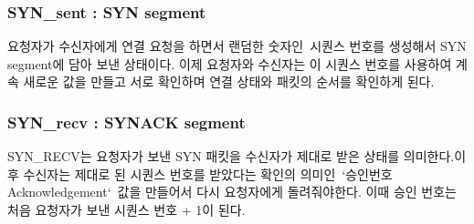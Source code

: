     \subsubsection*{SYN\_sent : SYN segment}
    요청자가 수신자에게 연결 요청을 하면서 랜덤한 숫자인 시퀀스 번호를 생성해서 SYN segment에 담아 보낸 상태이다. 이제 요청자와 수신자는 이 시퀀스 번호를 사용하여 계속 새로운 값을 만들고 서로 확인하며 연결 상태와 패킷의 순서를 확인하게 된다.
    \subsubsection*{SYN\_recv : SYNACK segment}
    SYN\_RECV는 요청자가 보낸 SYN 패킷을 수신자가 제대로 받은 상태를 의미한다.이후 수신자는 제대로 된 시퀀스 번호를 받았다는 확인의 의미인 `승인번호 Acknowledgement` 값을 만들어서 다시 요청자에게 돌려줘야한다. 이때 승인 번호는 처음 요청자가 보낸 시퀀스 번호 + 1이 된다.
